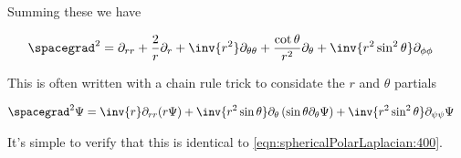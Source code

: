 Summing these we have

\begin{align}\label{eqn:sphericalPolarLaplacian:400}
\spacegrad^2 &=
\partial_{rr}
+ \frac{2}{r} \partial_r
+\inv{r^2} \partial_{\theta\theta}
+ \frac{\cot\theta}{r^2}\partial_\theta
+ \inv{r^2 \sin^2\theta} \partial_{\phi\phi}
\end{align}

This is often written with a chain rule trick to considate the $r$ and $\theta$ partials

\begin{align}\label{eqn:sphericalPolarLaplacian:401}
\spacegrad^2 \Psi &=
\inv{r} \partial_{rr} (r \Psi)
+ \inv{r^2 \sin\theta} \partial_\theta \left( \sin\theta \partial_\theta \Psi \right)
+ \inv{r^2 \sin^2\theta} \partial_{\psi\psi} \Psi
\end{align}

It's simple to verify that this is identical to \ref{eqn:sphericalPolarLaplacian:400}.

\EndArticle
